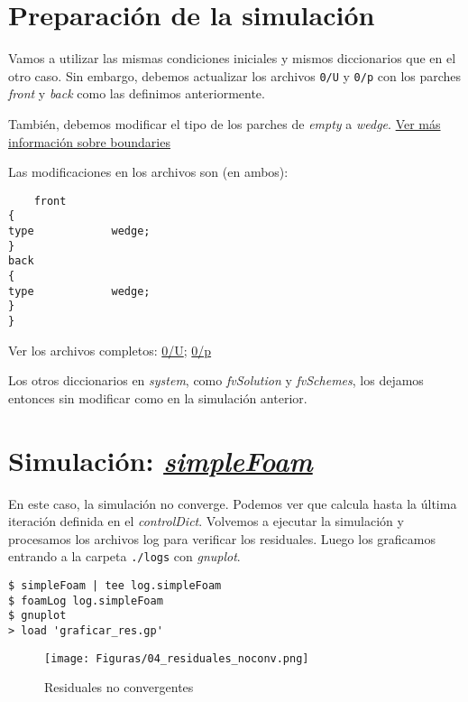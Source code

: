 \documentclass{article}
\begin{document}
\section{Preparación de la simulación}
Vamos a utilizar las mismas condiciones iniciales y mismos diccionarios que en el otro caso. Sin embargo, debemos actualizar los archivos \texttt{0/U} y \texttt{0/p} con los parches \textit{front} y \textit{back} como las definimos anteriormente.

También, debemos modificar el tipo de los parches de \textit{empty} a \textit{wedge}. \href{https://www.openfoam.com/documentation/user-guide/boundaries.php}{Ver más información sobre boundaries}

Las modificaciones en los archivos son (en ambos):
\begin{lstlisting}
    front
{
type            wedge;
}
back
{
type            wedge;
}
}
\end{lstlisting}

\noindent Ver los archivos completos: 
\href{https://github.com/guillerolle/casos_cfd/tree/master/02/0/U}{0/U};
\href{https://github.com/guillerolle/casos_cfd/tree/master/02/0/p}{0/p}

\bigskip
Los otros diccionarios en \textit{system}, como \textit{fvSolution} y \textit{fvSchemes}, los dejamos entonces sin modificar como en la simulación anterior.

\section{Simulación: \textit{\href{https://openfoamwiki.net/index.php/SimpleFoam}{simpleFoam}}}
En este caso, la simulación no converge. Podemos ver que calcula hasta la última iteración definida en el \textit{controlDict}.
Volvemos a ejecutar la simulación y procesamos los archivos log para verificar los residuales. Luego los graficamos entrando a la carpeta \texttt{./logs} con \textit{gnuplot}.

\begin{lstlisting}
$ simpleFoam | tee log.simpleFoam
$ foamLog log.simpleFoam
$ gnuplot 
> load 'graficar_res.gp'
\end{lstlisting}

\begin{figure}[h!]
	\centering
	\texttt{[image: Figuras/04\_residuales\_noconv.png]}
	\caption{Residuales no convergentes}
	\label{fig:resid_noconv}
\end{figure}
\end{document}
